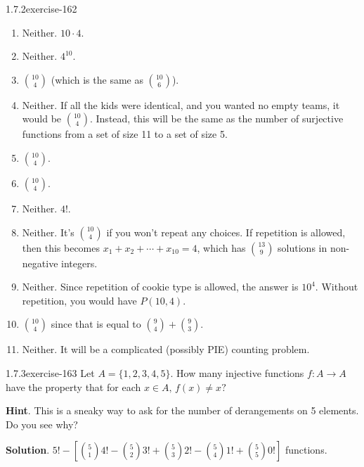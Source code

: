 \documentclass[twoside,11pt,]{book}
\numberwithin{equation}{chapter}
\begin{document}
\begin{divisionsolution}{1.7.2}{}{exercise-162}
\begin{enumerate}[label=(\alph*)]
\item\hypertarget{li-1581}{}\hypertarget{p-2663}{}%
Neither. \(10\cdot 4\).%
\item\hypertarget{li-1582}{}\hypertarget{p-2664}{}%
Neither. \(4^{10}\).%
\item\hypertarget{li-1583}{}\({10 \choose 4}\) (which is the same as \({10 \choose 6}\)).%
\item\hypertarget{li-1584}{}\hypertarget{p-2665}{}%
Neither. If all the kids were identical, and you wanted no empty teams, it would be \({10 \choose 4}\). Instead, this will be the same as the number of surjective functions from a set of size 11 to a set of size 5.%
\item\hypertarget{li-1585}{}\({10 \choose 4}\).%
\item\hypertarget{li-1586}{}\({10 \choose 4}\).%
\item\hypertarget{li-1587}{}\hypertarget{p-2666}{}%
Neither. \(4!\).%
\item\hypertarget{li-1588}{}\hypertarget{p-2667}{}%
Neither. It's \({10 \choose 4}\) if you won't repeat any choices. If repetition is allowed, then this becomes \(x_1 + x_2 + \cdots +x_{10} = 4\), which has \({13 \choose 9}\) solutions in non-negative integers.%
\item\hypertarget{li-1589}{}\hypertarget{p-2668}{}%
Neither. Since repetition of cookie type is allowed, the answer is \(10^4\). Without repetition, you would have \(P(10,4)\).%
\item\hypertarget{li-1590}{}\({10 \choose 4}\) since that is equal to \({9 \choose 4} + {9 \choose 3}\).%
\item\hypertarget{li-1591}{}\hypertarget{p-2669}{}%
Neither. It will be a complicated (possibly PIE) counting problem.%
\end{enumerate}
%
\end{divisionsolution}%
\begin{divisionsolution}{1.7.3}{}{exercise-163}%
\hypertarget{p-2674}{}%
Let \(A = \{1,2,3,4,5\}\text{.}\) How many injective functions \(f:A \to A\) have the property that for each \(x \in A\text{,}\) \(f(x) \ne x\text{?}\)%
\par\smallskip%
\noindent\textbf{Hint}.\quad%
\hypertarget{p-2676}{}%
This is a sneaky way to ask for the number of derangements on 5 elements.  Do you see why?%
\par\smallskip%
\noindent\textbf{Solution}.\quad%
\hypertarget{p-2677}{}%
\(5! - \left[{5 \choose 1}4! - {5 \choose 2}3! + {5 \choose 3}2! - {5 \choose 4}1! + {5 \choose 5}0!\right]\) functions.%
\end{divisionsolution}%
\end{document}

